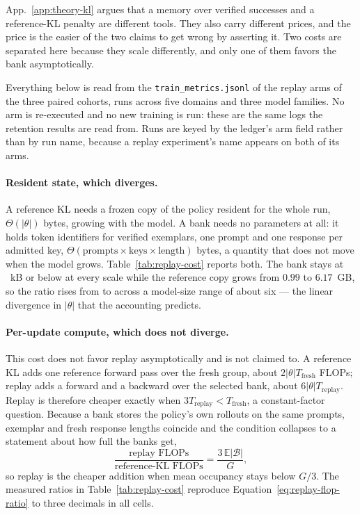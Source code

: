 \documentclass{article}
\newcommand{\1}{\mathbf 1}
\newcommand{\E}{\mathbb E}
\theoremstyle{remark}
\theoremstyle{definition}
\theoremstyle{plain}
\begin{document}
App.~\ref{app:theory-kl} argues that a memory over verified successes and a
reference-KL penalty are different tools. They also carry different prices, and
the price is the easier of the two claims to get wrong by asserting it. Two
costs are separated here because they scale differently, and only one of them
favors the bank asymptotically.

Everything below is read from the \texttt{train\_metrics.jsonl} of the replay
arms of the three paired cohorts, \MDcostRuns{} runs across five domains and
three model families. No arm is re-executed and no new training is run: these
are the same logs the retention results are read from. Runs are keyed by the
ledger's arm field rather than by run name, because a replay experiment's name
appears on both of its arms.

\paragraph{Resident state, which diverges.}
A reference KL needs a frozen copy of the policy resident for the whole run,
$\Theta(|\theta|)$ bytes, growing with the model. A bank needs no parameters at
all: it holds token identifiers for verified exemplars, one prompt and one
response per admitted key, $\Theta(\text{prompts}\times\text{keys}\times
\text{length})$ bytes, a quantity that does not move when the model grows.
Table~\ref{tab:replay-cost} reports both. The bank stays at
\MDcostBankKB{}~kB or below at every scale while the reference copy grows from
$0.99$ to $6.17$~GB, so the ratio rises from \MDcostStateMin{} to
\MDcostStateMax{} across a model-size range of about six --- the linear
divergence in $|\theta|$ that the accounting predicts.

\paragraph{Per-update compute, which does not diverge.}
This cost does not favor replay asymptotically and is not claimed to. A
reference KL adds one reference forward pass over the fresh group, about
$2|\theta|T_{\mathrm{fresh}}$ FLOPs; replay adds a forward and a backward over
the selected bank, about $6|\theta|T_{\mathrm{replay}}$. Replay is therefore
cheaper exactly when $3T_{\mathrm{replay}}<T_{\mathrm{fresh}}$, a
constant-factor question. Because a bank stores the policy's own rollouts on
the same prompts, exemplar and fresh response lengths coincide and the
condition collapses to a statement about how full the banks get,
\begin{equation}
  \frac{\text{replay FLOPs}}{\text{reference-KL FLOPs}}
  =\frac{3\,\E|\mathcal B|}{G},
  \label{eq:replay-flop-ratio}
\end{equation}
so replay is the cheaper addition when mean occupancy stays below $G/3$. The
measured ratios in Table~\ref{tab:replay-cost} reproduce
Equation~\eqref{eq:replay-flop-ratio} to three decimals in all
\MDcostCellsTotal{} cells.
\end{document}

